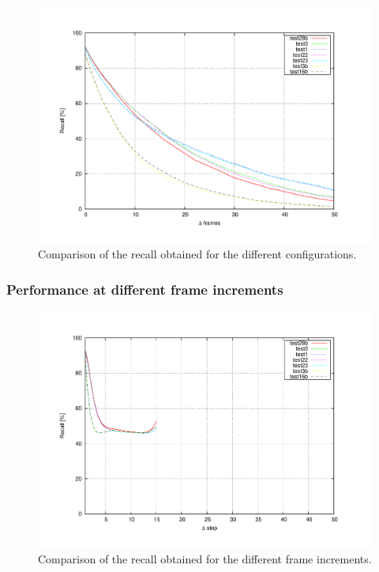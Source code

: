 \begin{figure}[h!]
\centering
\includegraphics[trim=50 40 80 60,clip]{recall_vs_delta_frames}
\caption{Comparison of the recall obtained for the different configurations.}\label{fig:cp04_recall_vs_delta_frames}
\end{figure}

\subsubsection{Performance at different frame increments}\label{ch:chapter04_06_03_02}

\begin{figure}[h!]
\centering
\includegraphics[trim=50 40 80 60,clip]{increments}
\caption{Comparison of the recall obtained for the different frame increments.}\label{fig:cp04_increments}
\end{figure}

